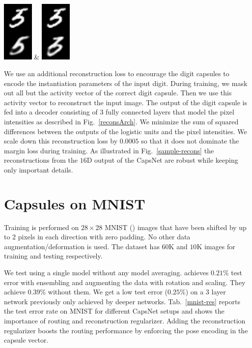 \documentclass{article}
\begin{document}
\begin{table}[t]
\begin{tabular}
\includegraphics[height=3cm]{recons/5_2035} &
\includegraphics[height=3cm]{recons/5_2035p}
\end{tabular}
\end{table}
We use an additional reconstruction loss to encourage the digit capsules to encode the instantiation parameters of the input digit. During training, we mask out all but the activity vector of the correct digit capsule. Then we use this activity vector to reconstruct the input image. The output of the digit capsule is fed into a decoder consisting of $3$ fully connected layers that model the pixel intensities as described in Fig.~\ref{reconsArch}. We minimize the sum of squared differences between the outputs of the logistic units and the pixel intensities. We scale down this reconstruction loss by $0.0005$ so that it does not dominate the margin loss during training. As illustrated in Fig.~\ref{sample-recons} the reconstructions from the $16$D output of the CapsNet are robust while keeping only important details.
\section{Capsules on MNIST}

Training is performed on $28 \times 28$ MNIST (\cite{lecun1998mnist}) images that have been shifted by up to $2$ pixels in each direction with zero padding. No other data augmentation/deformation is used. The dataset has $60$K and $10$K images for training and testing respectively.

We test using a single model without any model averaging. \cite{wan2013regularization} achieves $0.21$\% test error with ensembling and augmenting the data with rotation and scaling. They achieve $0.39$\% without them. We get a low test error ($\bm{0.25}$\%) on a $3$ layer network previously only achieved by deeper networks. Tab.~\ref{mnist-res} reports the test error rate on MNIST for different CapsNet setups and shows the importance of routing and reconstruction regularizer. Adding the reconstruction regularizer boosts the routing performance by enforcing the pose encoding in the capsule vector. 
\end{document}
